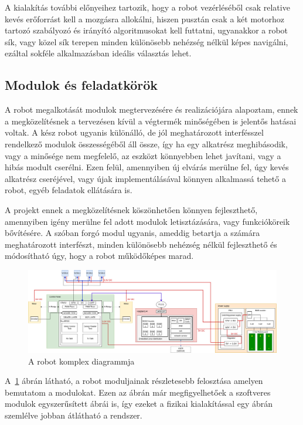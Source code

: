 A kialakítás további előnyeihez tartozik, hogy a robot vezérléséből csak relative
kevés erőforrást kell a mozgásra allokálni, hiszen pusztán csak a két motorhoz
tartozó szabályozó és irányító algoritmusokat kell futtatni, ugyanakkor a robot
sík, vagy közel sík terepen minden különösebb nehézség nélkül képes navigálni,
ezáltal sokféle alkalmazásban ideális választás lehet.

\subsection{Modulok és feladatkörök}

A robot megalkotását modulok megtervezésére és realizációjára alapoztam, ennek a
megközelítésnek a tervezésen kívül a végtermék minőségében is jelentős hatásai
voltak. A kész robot ugyanis különálló, de jól meghatározott interfésszel
rendelkező modulok összességéből áll össze, így ha egy alkatrész meghibásodik,
vagy a minősége nem megfelelő, az eszközt könnyebben lehet javítani, vagy a hibás
modult cserélni. Ezen felül, amennyiben új elvárás merülne fel, úgy kevés
alkatrész cseréjével, vagy újak implementálásával könnyen alkalmassá tehető a
robot, egyéb feladatok ellátására is.

A projekt ennek a megközelítésnek köszönhetően könnyen fejleszthető, amennyiben
igény merülne fel adott modulok letisztázására, vagy funkcióköreik bővítésére. A
szóban forgó modul ugyanis, ameddig betartja a számára meghatározott interfészt,
minden különösebb nehézség nélkül fejleszthető és módosítható úgy, hogy a robot
működőképes marad.

\begin{figure}
  \centering
  \includegraphics[width=150mm, keepaspectratio]{figures/ch2/robot-diagram-complex.png}
  \caption{A robot komplex diagrammja}
  \label{fig:robot-diagram-complex}
\end{figure}

\medskip

A~\ref{fig:robot-diagram-complex} ábrán látható, a robot moduljainak részletesebb
felosztása amelyen bemutatom a modulokat. Ezen az ábrán már megfigyelhetőek a
szoftveres modulok egyszerűsített ábrái is, így ezeket a fizikai kialakítással
egy ábrán szemlélve jobban átlátható a rendszer.

